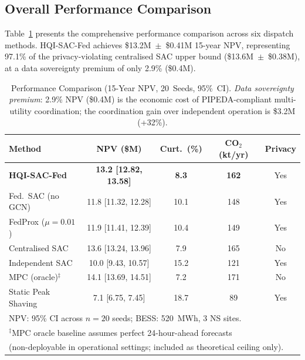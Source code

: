 \documentclass[journal]{IEEEtran}
\begin{document}
\subsection{Overall Performance Comparison}
\label{sec:performance}

Table~\ref{tab:performance} presents the comprehensive performance
comparison across six dispatch methods. HQI-SAC-Fed achieves
\$13.2M~$\pm$~\$0.41M 15-year NPV, representing 97.1\% of the
privacy-violating centralised SAC upper bound
(\$13.6M~$\pm$~\$0.38M), at a data sovereignty premium of only
2.9\% (\$0.4M).

\begin{table}[t]
\caption{Performance Comparison (15-Year NPV, 20~Seeds, 95\%~CI).
  \textit{Data sovereignty premium}: 2.9\% NPV (\$0.4M) is the economic
  cost of PIPEDA-compliant multi-utility coordination; the coordination
  gain over independent operation is \$3.2M (+32\%).}
\label{tab:performance}
\centering
\small
\begin{tabular}{lcccc}
\toprule
\textbf{Method} & \textbf{NPV (\$M)} & \textbf{Curt.\ (\%)} &
\textbf{CO$_2$ (kt/yr)} & \textbf{Privacy} \\
\midrule
\textbf{HQI-SAC-Fed}              & \textbf{13.2 [12.82, 13.58]} & \textbf{8.3}  & \textbf{162} & Yes \\
Fed.\ SAC (no GCN)               & 11.8 [11.32, 12.28]          & 10.1 & 148 & Yes \\
FedProx ($\mu{=}0.01$)~\cite{li2020fedprox} & 11.9 [11.41, 12.39] & 10.4 & 149 & Yes \\
Centralised SAC                  & 13.6 [13.24, 13.96]          & 7.9  & 165 & No  \\
Independent SAC                  & 10.0 [9.43, 10.57]           & 15.2 & 121 & Yes \\
MPC (oracle)$^\ddagger$          & 14.1 [13.69, 14.51]          & 7.2  & 171 & No  \\
Static Peak Shaving              & 7.1 [6.75, 7.45]             & 18.7 & 89  & Yes \\
\bottomrule
\multicolumn{5}{l}{\footnotesize NPV: 95\% CI across $n{=}20$ seeds; BESS: 520~MWh, 3 NS sites.}\\
\multicolumn{5}{l}{\footnotesize $^\ddagger$MPC oracle baseline assumes perfect 24-hour-ahead forecasts}\\
\multicolumn{5}{l}{\footnotesize (non-deployable in operational settings; included as theoretical ceiling only).}
\end{tabular}
\end{table}
\end{document}

